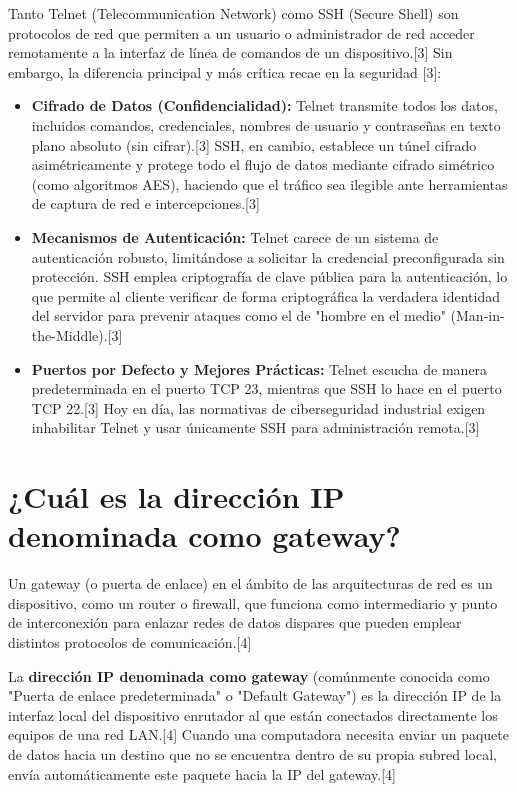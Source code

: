 \documentclass[a4paper,12pt]{article}
\begin{document}
Tanto Telnet (Telecommunication Network) como SSH (Secure Shell) son protocolos de red que permiten a un usuario o administrador de red acceder remotamente a la interfaz de línea de comandos de un dispositivo.[3] Sin embargo, la diferencia principal y más crítica recae en la seguridad [3]:

\begin{itemize}
    \item \textbf{Cifrado de Datos (Confidencialidad):} Telnet transmite todos los datos, incluidos comandos, credenciales, nombres de usuario y contraseñas en texto plano absoluto (sin cifrar).[3] SSH, en cambio, establece un túnel cifrado asimétricamente y protege todo el flujo de datos mediante cifrado simétrico (como algoritmos AES), haciendo que el tráfico sea ilegible ante herramientas de captura de red e intercepciones.[3]
    \item \textbf{Mecanismos de Autenticación:} Telnet carece de un sistema de autenticación robusto, limitándose a solicitar la credencial preconfigurada sin protección. SSH emplea criptografía de clave pública para la autenticación, lo que permite al cliente verificar de forma criptográfica la verdadera identidad del servidor para prevenir ataques como el de "hombre en el medio" (Man-in-the-Middle).[3]
    \item \textbf{Puertos por Defecto y Mejores Prácticas:} Telnet escucha de manera predeterminada en el puerto TCP 23, mientras que SSH lo hace en el puerto TCP 22.[3] Hoy en día, las normativas de ciberseguridad industrial exigen inhabilitar Telnet y usar únicamente SSH para administración remota.[3]
\end{itemize}


\newpage
\section{¿Cuál es la dirección IP denominada como gateway?}

Un gateway (o puerta de enlace) en el ámbito de las arquitecturas de red es un dispositivo, como un router o firewall, que funciona como intermediario y punto de interconexión para enlazar redes de datos dispares que pueden emplear distintos protocolos de comunicación.[4]

La \textbf{dirección IP denominada como gateway} (comúnmente conocida como "Puerta de enlace predeterminada" o "Default Gateway") es la dirección IP de la interfaz local del dispositivo enrutador al que están conectados directamente los equipos de una red LAN.[4] Cuando una computadora necesita enviar un paquete de datos hacia un destino que no se encuentra dentro de su propia subred local, envía automáticamente este paquete hacia la IP del gateway.[4] 
\end{document}
